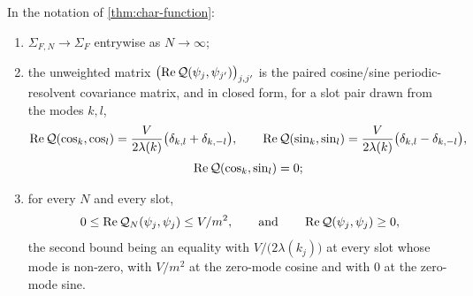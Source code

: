 \begin{lemma}\label{lem:hC-identification}
In the notation of \cref{thm:char-function}:
\begin{enumerate}
\item[(i)] $\Sigma_{F,N}\to\Sigma_F$ entrywise as $N\to\infty$;
\item[(ii)] the unweighted matrix $\bigl(\operatorname{Re}\mathcal Q(\psi_j,\psi_{j'})\bigr)_{j,j'}$
  is the paired cosine/sine periodic-resolvent covariance matrix, and in closed
  form, for a slot pair drawn from the modes $k,l$,
  \begin{equation}\label{eq:entries}
    \begin{gathered}
      \operatorname{Re}\mathcal Q(\cos_k,\cos_l)=\frac{V}{2\lambda(k)}\bigl(\delta_{k,l}+\delta_{k,-l}\bigr),
      \qquad
      \operatorname{Re}\mathcal Q(\sin_k,\sin_l)=\frac{V}{2\lambda(k)}\bigl(\delta_{k,l}-\delta_{k,-l}\bigr),\\[2pt]
      \operatorname{Re}\mathcal Q(\cos_k,\sin_l)=0 ;
    \end{gathered}
  \end{equation}
\item[(iii)] for every $N$ and every slot,
  \[
    0\le\operatorname{Re} \mathcal Q_N(\psi_j,\psi_j)\le V/m^{2},
    \qquad\text{and}\qquad
    \operatorname{Re}\mathcal Q(\psi_j,\psi_j)\ge0 ,
  \]
  the second bound being an equality with $V/\bigl(2\lambda(k_j)\bigr)$ at every
  slot whose mode is non-zero, with $V/m^{2}$ at the zero-mode cosine and with
  $0$ at the zero-mode sine.
\end{enumerate}
\end{lemma}

